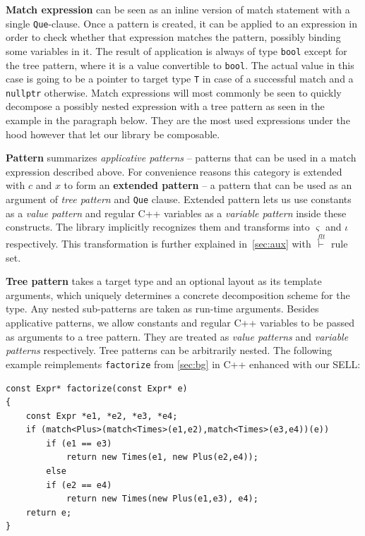 \documentclass[preprint]{sigplanconf}
\makeatletter
\DeclareRobustCommand{\code}[1]{{\lstinline[breaklines=false,escapechar=@]{#1}}}
\makeatother
\begin{document}
{\bf Match expression} can be seen as an inline version of match statement with 
a single \code{Que}-clause. Once a pattern is created, it can be applied to an 
expression in order to check whether that expression matches the pattern, 
possibly binding some variables in it. The result of application is always of 
type \code{bool} except for the tree pattern, where it is a value convertible to 
\code{bool}. The actual value in this case is going to be a pointer to target 
type \code{T} in case of a successful match and a \code{nullptr} otherwise. 
Match expressions will most commonly be seen to quickly decompose a possibly 
nested expression with a tree pattern as seen in the example in the paragraph 
below. They are the most used expressions under the hood however that let our 
library be composable. 

{\bf Pattern} summarizes \emph{applicative patterns} -- patterns that can be 
used in a match expression described above. For convenience reasons this 
category is extended with $c$ and $x$ to form an {\bf extended pattern} -- a
pattern that can be used as an argument of \emph{tree pattern} and \code{Que} 
clause. Extended pattern lets us use constants as a \emph{value pattern} and 
regular C++ variables as a \emph{variable pattern} inside these constructs. The 
library implicitly recognizes them and transforms into $\varsigma$ and $\iota$ 
respectively. This transformation is further explained in~\textsection\ref{sec:aux} 
with $\stackrel{flt}{\vdash}$ rule set.

{\bf Tree pattern} takes a target type and an optional layout as its template 
arguments, which uniquely determines a concrete decomposition scheme for the 
type. Any nested sub-patterns are taken as run-time arguments. Besides 
applicative patterns, we allow constants and regular C++ variables to be passed 
as arguments to a tree pattern. They are treated as \emph{value patterns} and 
\emph{variable patterns} respectively. Tree patterns can be arbitrarily nested. 
The following example reimplements \code{factorize} from 
\textsection\ref{sec:bg} in C++ enhanced with our SELL:

\begin{lstlisting}
const Expr* factorize(const Expr* e)
{
    const Expr *e1, *e2, *e3, *e4;
    if (match<Plus>(match<Times>(e1,e2),match<Times>(e3,e4))(e))
        if (e1 == e3)
            return new Times(e1, new Plus(e2,e4));
        else
        if (e2 == e4)
            return new Times(new Plus(e1,e3), e4);
    return e;
}
\end{lstlisting}
\end{document}
